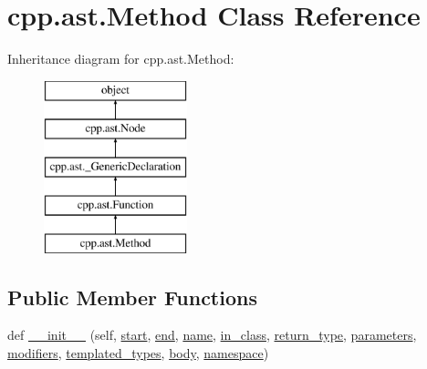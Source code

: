 \hypertarget{classcpp_1_1ast_1_1_method}{}\section{cpp.\+ast.\+Method Class Reference}
\label{classcpp_1_1ast_1_1_method}
Inheritance diagram for cpp.\+ast.\+Method\+:\begin{figure}[H]
\begin{center}
\leavevmode
\includegraphics[height=5.000000cm]{da/d78/classcpp_1_1ast_1_1_method}
\end{center}
\end{figure}
\subsection*{Public Member Functions}
\begin{DoxyCompactItemize}
\item 
def \mbox{\hyperlink{classcpp_1_1ast_1_1_method_aa3cbdc9c4b7e92b15fa6acea0dbf2322}{\+\_\+\+\_\+init\+\_\+\+\_\+}} (self, \mbox{\hyperlink{classcpp_1_1ast_1_1_node_a7b2aa97e6a049bb1a93aea48c48f1f44}{start}}, \mbox{\hyperlink{classcpp_1_1ast_1_1_node_a3c5e5246ccf619df28eca02e29d69647}{end}}, \mbox{\hyperlink{classcpp_1_1ast_1_1___generic_declaration_af774f4729dfd78d0538a6782fe8514c1}{name}}, \mbox{\hyperlink{classcpp_1_1ast_1_1_method_aa67244c3673afed43398b5d3e3fa6c1c}{in\+\_\+class}}, \mbox{\hyperlink{classcpp_1_1ast_1_1_function_af750fd788d7ab33163ee066534780212}{return\+\_\+type}}, \mbox{\hyperlink{classcpp_1_1ast_1_1_function_a0e61ef47af9cf2fd4402dbd8cab631ef}{parameters}}, \mbox{\hyperlink{classcpp_1_1ast_1_1_function_ad30eed435f1ff9ff34ade9cc0d7be121}{modifiers}}, \mbox{\hyperlink{classcpp_1_1ast_1_1_function_a57bb03218bade3240137a0d91c467cb6}{templated\+\_\+types}}, \mbox{\hyperlink{classcpp_1_1ast_1_1_function_a8e25e5016b23b38e32acf2df529c0650}{body}}, \mbox{\hyperlink{classcpp_1_1ast_1_1___generic_declaration_a8aee3f11b37449d54b42a78e0a689f46}{namespace}})
\end{DoxyCompactItemize}
